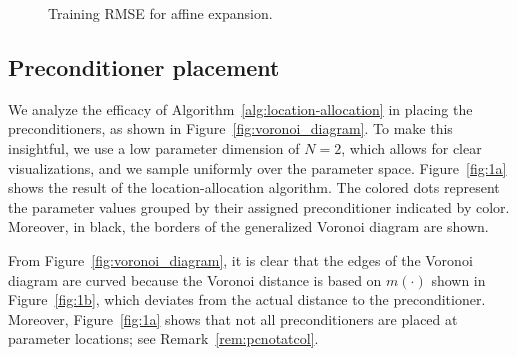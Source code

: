 \begin{figure}
    \caption{Training RMSE for affine expansion.}
    \label{fig:pietrain}
\end{figure}



\subsection{Preconditioner placement}\label{subsec:preconditioner-placement}
We analyze the efficacy of Algorithm~\ref{alg:location-allocation} in placing the preconditioners, as shown in Figure~\ref{fig:voronoi_diagram}.
To make this insightful, we use a low parameter dimension of $N=2$, which allows for clear visualizations, and we sample uniformly over the parameter space.
Figure~\ref{fig:1a} shows the result of the location-allocation algorithm.
The colored dots represent the parameter values grouped by their assigned preconditioner indicated by color.
Moreover, in black, the borders of the generalized Voronoi diagram are shown.

From Figure~\ref{fig:voronoi_diagram}, it is clear that the edges of the Voronoi diagram are curved because the Voronoi distance is based on $m(\cdot)$ shown in Figure~\ref{fig:1b}, which deviates from the actual distance to the preconditioner.
Moreover, Figure~\ref{fig:1a} shows that not all preconditioners are placed at parameter locations; see Remark~\ref{rem:pcnotatcol}.



